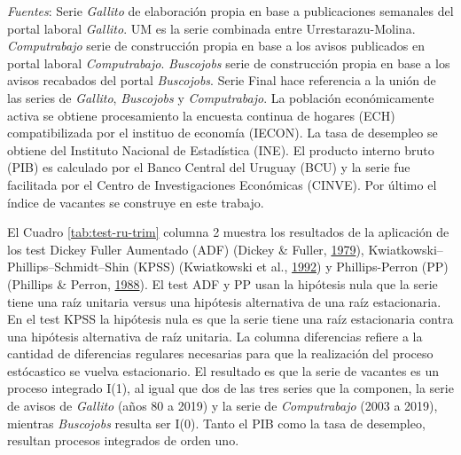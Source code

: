 \documentclass[12pt,oneside]{reedthesis}
\begin{document}
\begin{table}
{\begin{threeparttable}
\begin{tablenotes}
\textit{Fuentes}: Serie \textit{Gallito} de elaboración propia en base a publicaciones semanales del portal laboral \textit{Gallito}. UM es la serie combinada entre Urrestarazu-Molina. \textit{Computrabajo} serie de construcción propia en base a los avisos publicados en portal laboral \textit{Computrabajo}. \textit{Buscojobs} serie de construcción propia en base a los avisos recabados del portal \textit{Buscojobs}. Serie Final hace referencia a la unión de las series de \textit{Gallito}, \textit{Buscojobs} y \textit{Computrabajo}. La población económicamente activa se obtiene procesamiento la encuesta continua de hogares (ECH) compatibilizada por el instituo de economía (IECON). La tasa de desempleo se obtiene del Instituto Nacional de Estadística (INE). El producto interno bruto (PIB) es calculado por el Banco Central del Uruguay (BCU) y la serie fue facilitada por el Centro de Investigaciones Económicas (CINVE). Por último el índice de vacantes se construye en este trabajo.
\end{tablenotes}
\end{threeparttable}}
\end{table}
El Cuadro \ref{tab:test-ru-trim} columna 2 muestra los resultados de la aplicación de los test Dickey Fuller Aumentado (ADF) (Dickey \& Fuller, \protect\hyperlink{ref-DickeyFuller1979}{1979}), Kwiatkowski--Phillips--Schmidt--Shin (KPSS) (Kwiatkowski et al., \protect\hyperlink{ref-KPSS1992}{1992}) y Phillips-Perron (PP) (Phillips \& Perron, \protect\hyperlink{ref-PhillipsPerron1988}{1988}). El test ADF y PP usan la hipótesis nula que la serie tiene una raíz unitaria versus una hipótesis alternativa de una raíz estacionaria. En el test KPSS la hipótesis nula es que la serie tiene una raíz estacionaria contra una hipótesis alternativa de raíz unitaria. La columna diferencias refiere a la cantidad de diferencias regulares necesarias para que la realización del proceso estócastico se vuelva estacionario. El resultado es que la serie de vacantes es un proceso integrado I(1), al igual que dos de las tres series que la componen, la serie de avisos de \emph{Gallito} (años 80 a 2019) y la serie de \emph{Computrabajo} (2003 a 2019), mientras \emph{Buscojobs} resulta ser I(0). Tanto el PIB como la tasa de desempleo, resultan procesos integrados de orden uno.
\end{document}
